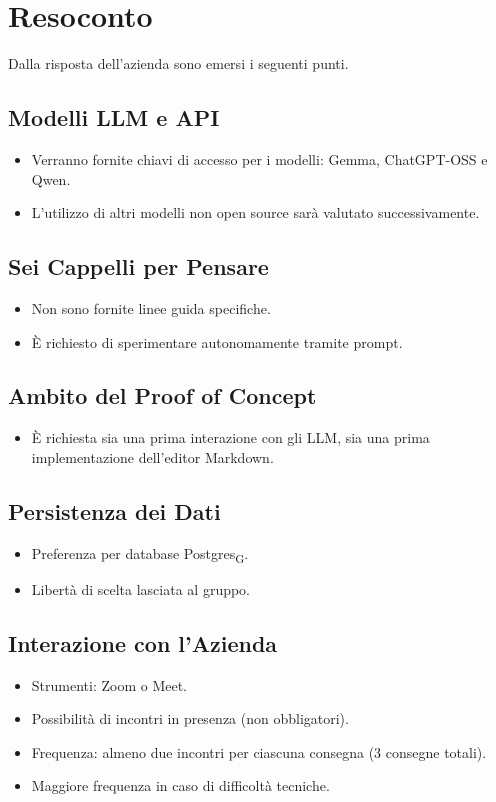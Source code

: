 \section{Resoconto}
Dalla risposta dell'azienda sono emersi i seguenti punti.

\subsection{Modelli LLM e API}
\begin{itemize}
	\item Verranno fornite chiavi di accesso per i modelli: Gemma, ChatGPT-OSS e Qwen.
	\item L’utilizzo di altri modelli non open source sarà valutato successivamente.
\end{itemize}

\subsection{Sei Cappelli per Pensare}
\begin{itemize}
	\item Non sono fornite linee guida specifiche.
	\item È richiesto di sperimentare autonomamente tramite prompt.
\end{itemize}

\subsection{Ambito del Proof of Concept}
\begin{itemize}
	\item È richiesta sia una prima interazione con gli LLM, sia una prima implementazione dell’editor Markdown.
\end{itemize}

\subsection{Persistenza dei Dati}
\begin{itemize}
	\item Preferenza per database Postgres\textsubscript{G}.
	\item Libertà di scelta lasciata al gruppo.
\end{itemize}

\subsection{Interazione con l'Azienda}
\begin{itemize}
	\item Strumenti: Zoom o Meet.
	\item Possibilità di incontri in presenza (non obbligatori).
	\item Frequenza: almeno due incontri per ciascuna consegna (3 consegne totali).
	\item Maggiore frequenza in caso di difficoltà tecniche.
\end{itemize}


